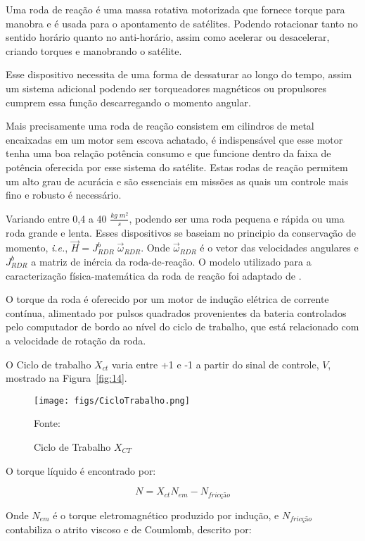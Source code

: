 Uma roda de reação é uma massa rotativa motorizada que fornece torque para manobra e é usada para o apontamento de satélites. Podendo rotacionar tanto no sentido horário quanto no anti-horário, assim como acelerar ou desacelerar, criando torques e manobrando o satélite.

Esse dispositivo necessita de uma forma de dessaturar ao longo do tempo, assim um sistema adicional podendo ser torqueadores magnéticos ou propulsores cumprem essa função descarregando o momento angular.

Mais precisamente uma roda de reação consistem em cilindros de metal encaixadas em um motor sem escova achatado, é indispensável que esse motor tenha uma boa relação potência consumo e que funcione dentro da faixa de potência oferecida por esse sistema do satélite. Estas rodas de reação permitem um alto grau de acurácia e são essenciais em missões as quais um controle mais fino e robusto é necessário.

Variando entre 0,4 a 40 $\frac{kg\;m^2}{s}$, podendo ser uma roda pequena e rápida ou uma roda grande e lenta. Esses dispositivos se baseiam no principio da conservação de momento, \textit{i.e.}, $\vec{H}=J^b_{RDR}\;\vec{\omega}_{RDR}$. Onde $\vec{\omega}_{RDR}$ é o vetor das velocidades angulares e $J^b_{RDR}$ a matriz de inércia da roda-de-reação. O modelo utilizado para a caracterização física-matemática da roda de reação foi adaptado de \cite[p.~270-271]{wertz2012spacecraft}.

O torque da roda é oferecido por um motor de indução elétrica de corrente contínua, alimentado por pulsos quadrados provenientes da bateria controlados pelo computador de bordo ao nível do ciclo de trabalho, que está relacionado com a velocidade de rotação da roda.

O Ciclo de trabalho $X_{ct}$ varia entre +1 e -1 a partir do sinal de controle, $V$, mostrado na Figura~\ref{fig:14}.

\begin{figure}[htpb]
\centering
\texttt{[image: figs/CicloTrabalho.png]}
\caption{Ciclo de Trabalho $X_{CT}$}
{Fonte: \cite[p.~271]{wertz2012spacecraft}}
\label{fig:6}
\end{figure}

O torque líquido é encontrado por:

\begin{equation}N=X_{ct}N_{em}-N_{fricção}\end{equation}

Onde $N_{em}$ é o torque eletromagnético produzido por indução, e $N_{fricção}$ contabiliza o atrito viscoso e de Coumlomb, descrito por:


